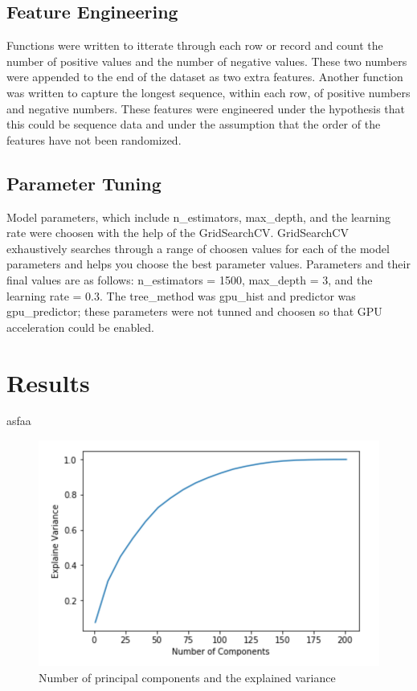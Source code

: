 \documentclass[11pt,letterpaper]{article}
\begin{document}
\subsection{Feature Engineering}
Functions were written to itterate through each row or record and count the
number of positive values and the number of negative values.  These two numbers
were appended to the end of the dataset as two extra features.  Another function
was written to capture the longest sequence, within each row, of positive
numbers and negative numbers.  These features were engineered under the
hypothesis that this could be sequence data and under the assumption that the
order of the features have not been randomized. 

\subsection{Parameter Tuning}
Model parameters, which include n\_estimators, max\_depth, and the learning rate
were choosen with the help of the GridSearchCV.  GridSearchCV exhaustively
searches through a range of choosen values for each of the model parameters and
helps you choose the best parameter values.  Parameters and their final values
are as follows: n\_estimators = 1500, max\_depth = 3, and the learning rate =
0.3. The tree\_method was gpu\_hist and predictor was gpu\_predictor; these
parameters were not tunned and choosen so that GPU acceleration could be
enabled.   

\section{Results}

asfaa

\begin{figure}[h!]
    \centering
        \includegraphics[width=.5\textwidth]{pca_explain.png}
        \caption{Number of principal components and the explained variance}
        \label{fig:pca_explain}
    \label{fig:count_dist}
\end{figure}
\end{document}
